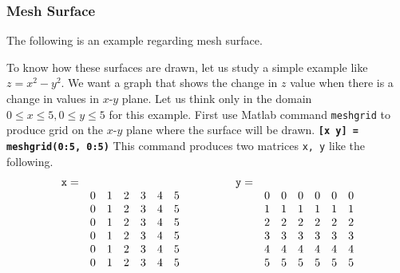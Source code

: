 \subsubsection{Mesh Surface}
The following is an example regarding mesh surface.

\begin{center}
\end{center}

\vv To know how these surfaces are drawn, let us study a simple example like $z = x^{2} - y^{2}$. We want a graph that shows the change in $z$ value when there is a change in values in $x$-$y$ plane. Let us think only in the domain $0 \leq x \leq 5, 0 \leq y \leq 5$ for this example. First use Matlab command {\tt meshgrid} to produce grid on the $x$-$y$ plane where the surface will be drawn. \matlabp\texttt{\textbf{[x y] = meshgrid(0:5, 0:5)}} \vn This command produces two matrices {\tt x, y} like the following.
$$\begin{array}{ccccccc}
{\tt x =} & & & & & & \\
& 0 & 1 & 2 & 3 & 4 & 5 \\
& 0 & 1 & 2 & 3 & 4 & 5 \\
& 0 & 1 & 2 & 3 & 4 & 5 \\
& 0 & 1 & 2 & 3 & 4 & 5 \\
& 0 & 1 & 2 & 3 & 4 & 5 \\
& 0 & 1 & 2 & 3 & 4 & 5
      \end{array}\qquad\qquad
\begin{array}{ccccccc}
{\tt y =} & & & & & & \\
& 0 & 0 & 0 & 0 & 0 & 0 \\
& 1 & 1 & 1 & 1 & 1 & 1 \\
& 2 & 2 & 2 & 2 & 2 & 2 \\
& 3 & 3 & 3 & 3 & 3 & 3 \\
& 4 & 4 & 4 & 4 & 4 & 4 \\
& 5 & 5 & 5 & 5 & 5 & 5
\end{array}$$

